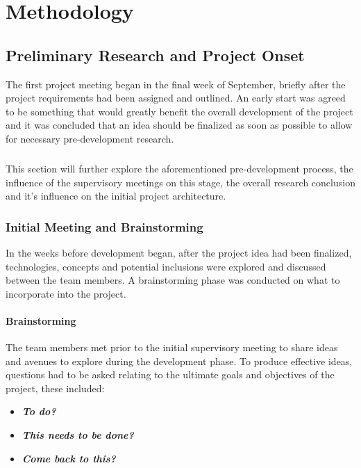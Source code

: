 \chapter{Methodology}

\section{Preliminary Research and Project Onset}
The first project meeting began in the final week of September, briefly after the project requirements had been assigned and outlined. An early start was agreed to be something that would greatly benefit the overall development of the project and it was concluded that an idea should be finalized as soon as possible to allow for necessary pre-development research.

\paragraph{}
This section will further explore the aforementioned pre-development process, the influence of the supervisory meetings on this stage, the overall research conclusion and it's influence on the initial project architecture.

\subsection{Initial Meeting and Brainstorming}
In the weeks before development began, after the project idea had been finalized, technologies, concepts and potential inclusions were explored and discussed between the team members. A brainstorming phase was conducted on what to incorporate into the project.

\subsubsection{Brainstorming}
The team members met prior to the initial supervisory meeting to share ideas and avenues to explore during the development phase. To produce effective ideas, questions had to be asked relating to the ultimate goals and objectives of the project, these included:

\begin{itemize}
    \item\textit{\textbf{To do?}}
    \item\textit{\textbf{This needs to be done?}}
    \item\textit{\textbf{Come back to this?}}
\end{itemize}

